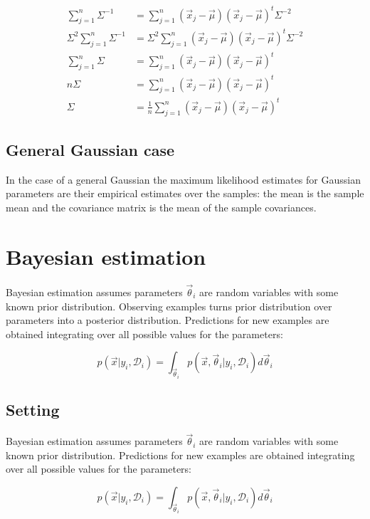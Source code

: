 								\begin{align*}
									\sum\limits_{j=1}^n\Sigma^{-1} &= \sum\limits_{j=1}^n(\vec{x}_j-\vec{\mu})(\vec{x}_j-\vec{\mu})^t\Sigma^{-2}\\
									\Sigma^2\sum\limits_{j=1}^n\Sigma^{-1}&=\Sigma^2\sum\limits_{j=1}^n(\vec{x}_j-\vec{\mu})(\vec{x}_j-\vec{\mu})^t\Sigma^{-2}\\
									\sum\limits_{j=1}^n\Sigma &= \sum\limits_{j=1}^n(\vec{x}_j-\vec{\mu})(\vec{x}_j-\vec{\mu})^t\\
									n\Sigma &= \sum\limits_{j=1}^n(\vec{x}_j-\vec{\mu})(\vec{x}_j-\vec{\mu})^t\\
									\Sigma &= \frac{1}{n}\sum\limits_{j=1}^n(\vec{x}_j-\vec{\mu})(\vec{x}_j-\vec{\mu})^t
								\end{align*}



	\subsection{General Gaussian case}
	In the case of a general Gaussian the maximum likelihood estimates for Gaussian parameters are their empirical estimates over the samples: the mean is the sample mean and the covariance matrix is the mean of the sample covariances.


\section{Bayesian estimation}
Bayesian estimation assumes parameters $\vec{\theta}_i$ are random variables with some known prior distribution.
Observing examples turns prior distribution over parameters into a posterior distribution.
Predictions for new examples are obtained integrating over all possible values for the parameters:

$$p(\vec{x}|y_i, \mathcal{D}_i) = \int_{\vec{\theta}_i}p(\vec{x}, \vec{\theta}_i|y_i, \mathcal{D}_i)d\vec{\theta}_i$$

	\subsection{Setting}
	Bayesian estimation assumes parameters $\vec{\theta}_i$ are random variables with some known prior distribution.
	Predictions for new examples are obtained integrating over all possible values for the parameters:

	$$p(\vec{x}|y_i, \mathcal{D}_i) = \int_{\vec{\theta}_i}p(\vec{x}, \vec{\theta}_i|y_i, \mathcal{D}_i)d\vec{\theta}_i$$

